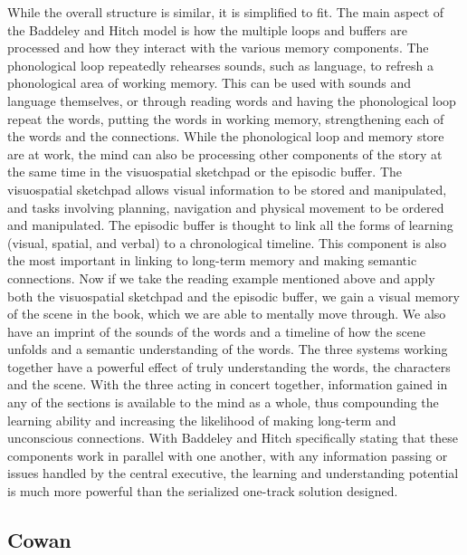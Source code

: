 While the overall structure is similar, it is simplified to fit.  The main
aspect of the Baddeley and Hitch model is how the multiple loops and buffers are
processed and how they interact with the various memory components.  The
phonological loop repeatedly rehearses sounds, such as language, to refresh a
phonological area of working memory.  This can be used with sounds and language
themselves, or through reading words and having the phonological loop repeat the
words, putting the words in working memory, strengthening each of the words and
the connections.  While the phonological loop and memory store
are at work, the mind can also be processing other components of the story at
the same time in the visuospatial sketchpad or the episodic buffer. The
visuospatial sketchpad allows visual information to be stored and manipulated,
and tasks involving planning, navigation and physical movement to be ordered and
manipulated.  The episodic buffer is thought to link all the forms of learning
(visual, spatial, and verbal) to a chronological timeline.  This component is also
the most important in linking to long-term memory and making semantic
connections.  Now if we take the reading example mentioned above and apply both
the visuospatial sketchpad and the episodic buffer, we gain a visual memory of
the scene in the book, which we are able to mentally move through.  We also have
an imprint of the sounds of the words and a timeline of how the scene unfolds
and a semantic understanding of the words.  The three systems working together
have a powerful effect of truly understanding the words, the characters and the
scene. With the three acting in concert together, information gained in any of
the sections is available to the mind as a whole, thus compounding the learning
ability and increasing the likelihood of making long-term and unconscious
connections.  With Baddeley and Hitch specifically stating that these components
work in parallel with one another, with any information passing or issues
handled by the central executive, the learning and understanding potential is
much more powerful than the serialized one-track solution designed.

\subsection{Cowan}

